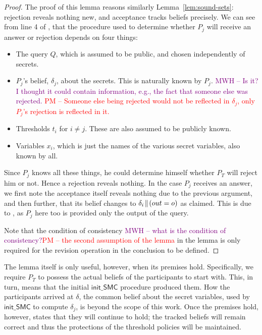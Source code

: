 \documentclass[10pt]{sigplanconf}
\newcommand{\mwh}[1]{\textcolor{purple}{MWH -- #1}}
\newcommand{\pxm}[1]{\textcolor{red}{PM -- #1}}
\newcommand{\mwh}[1]{}
\newcommand{\pxm}[1]{}
\begin{document}
\begin{proof}
The proof of this lemma reasons similarly
Lemma~\ref{lem:sound-sets}: rejection  reveals nothing new, and
acceptance tracks beliefs precisely.   We can see from
line 4 of ,
that the procedure used to determine whether $ P_j $ will receive
an answer or  rejection depends on four things:
\begin{itemize}
\item{} The query $ Q $, which is assumed to be public, and chosen
independently of secrets.
\item{} $P_j$'s belief, $ \delta_j $, about the secrets. This is
naturally known by $ P_j $. \mwh{Is it?  I thought it could contain
  information, e.g., the fact that someone else was
  rejected.} \pxm{Someone else being rejected would not be reflected
  in $ \delta_j $, only $ P_j $'s rejection is reflected in it.}
\item{} Thresholds $ t_i $ for $ i \neq j $. These are also assumed to
be publicly known.
\item{} Variables $ x_i $, which is just the names of the various secret
variables, also known by all.
\end{itemize}
Since $ P_j $ knows all these things, he could determine himself
whether $ P_T $ will reject him or not. Hence a rejection reveals
nothing.  In the case $ P_j $ receives an answer, we first note the
acceptance
itself reveals nothing due to the previous argument, and then further,
that its belief changes to $ \delta_i\!\parallel\!{(out = o)} $ as
claimed. This is due to , as $ P_j $ here too is
provided only the output of the query.

Note that the condition of consistency \mwh{what is the condition of
  consistency?}\pxm{the second assumption of the lemma} in the lemma is only required
for the revision operation in the conclusion to be defined. \end{proof}

The lemma itself is only useful, however, when its premises
hold. Specifically, we require $ P_T $ to possess the actual beliefs
of the participants to start with. This, in turn, means that the
initial $ \mathsf{init\_SMC} $ procedure produced them. How the
participants arrived at $ \delta $, the common belief about the secret
variables, used by $ \mathsf{init\_SMC} $ to compute $ \delta_j $, is
beyond the scope of this work. Once the premises hold,
however,  states that they will continue to hold;
the tracked beliefs will remain correct and thus the protections of
the threshold policies will be maintained.
\end{document}
